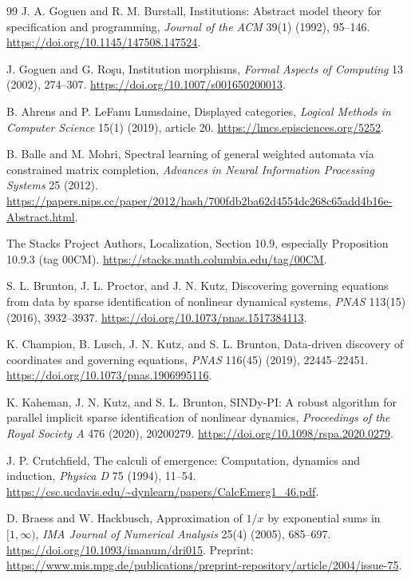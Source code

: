 \documentclass[11pt]{article}
\theoremstyle{definition}
\begin{document}
\begin{thebibliography}{99}
J. A. Goguen and R. M. Burstall, Institutions: Abstract model theory for
specification and programming, \emph{Journal of the ACM} 39(1) (1992), 95--146.
\url{https://doi.org/10.1145/147508.147524}.

J. Goguen and G. Ro\c{s}u, Institution morphisms,
\emph{Formal Aspects of Computing} 13 (2002), 274--307.
\url{https://doi.org/10.1007/s001650200013}.

B. Ahrens and P. LeFanu Lumsdaine, Displayed categories,
\emph{Logical Methods in Computer Science} 15(1) (2019), article 20.
\url{https://lmcs.episciences.org/5252}.

B. Balle and M. Mohri, Spectral learning of general weighted automata via
constrained matrix completion, \emph{Advances in Neural Information Processing
Systems} 25 (2012).
\url{https://papers.nips.cc/paper/2012/hash/700fdb2ba62d4554dc268c65add4b16e-Abstract.html}.

The Stacks Project Authors, Localization, Section 10.9, especially
Proposition 10.9.3 (tag 00CM).
\url{https://stacks.math.columbia.edu/tag/00CM}.

S. L. Brunton, J. L. Proctor, and J. N. Kutz, Discovering governing equations
from data by sparse identification of nonlinear dynamical systems,
\emph{PNAS} 113(15) (2016), 3932--3937.
\url{https://doi.org/10.1073/pnas.1517384113}.

K. Champion, B. Lusch, J. N. Kutz, and S. L. Brunton, Data-driven discovery
of coordinates and governing equations, \emph{PNAS} 116(45) (2019),
22445--22451.
\url{https://doi.org/10.1073/pnas.1906995116}.

K. Kaheman, J. N. Kutz, and S. L. Brunton, SINDy-PI: A robust algorithm
for parallel implicit sparse identification of nonlinear dynamics,
\emph{Proceedings of the Royal Society A} 476 (2020), 20200279.
\url{https://doi.org/10.1098/rspa.2020.0279}.

J. P. Crutchfield, The calculi of emergence: Computation, dynamics and
induction, \emph{Physica D} 75 (1994), 11--54.
\url{https://csc.ucdavis.edu/~dynlearn/papers/CalcEmerg1_46.pdf}.

D. Braess and W. Hackbusch, Approximation of $1/x$ by exponential sums in
$[1,\infty)$, \emph{IMA Journal of Numerical Analysis} 25(4) (2005), 685--697.
\url{https://doi.org/10.1093/imanum/dri015}.
Preprint: \url{https://www.mis.mpg.de/publications/preprint-repository/article/2004/issue-75}.



\end{thebibliography}
\end{document}
